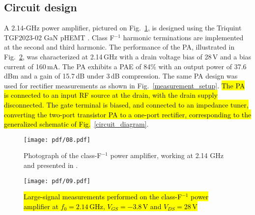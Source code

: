 \subsection {Circuit design}

A 2.14-GHz power amplifier, pictured on Fig.~\ref{amplifier}, is designed using the Triquint TGF2023-02 GaN pHEMT \cite{gan_pa_letter}. Class F$^{-1}$ harmonic terminations are implemented at the second and third harmonic. The performance of the PA, illustrated in  Fig.~\ref{PA_meas}, was characterized at 2.14\,GHz with a drain voltage bias of 28\,V and a bias current of 160\,mA. The PA exhibits a PAE of 84\% with an output power of 37.6\,dBm and a gain of 15.7\,dB under 3\,dB compression. The same PA design was used for rectifier measurements as shown in Fig.~\ref{measurement_setup}. \hl{The PA is connected to an input RF source at the drain, with the drain supply disconnected. The gate terminal is biased, and connected to an impedance tuner, converting the two-port transistor PA to a one-port rectifier, corresponding to the generalized schematic of Fig.}~\ref{circuit_diagram}.

\begin{figure}[ht!]
\centering
\texttt{[image: pdf/08.pdf]}
\caption{Photograph of the class-F$^{-1}$ power amplifier, working at 2.14 GHz and presented in \cite{gan_pa_letter}.}
\label{amplifier}
\end{figure}


\begin{figure}
  \begin{center}
  \texttt{[image: pdf/09.pdf]}
  \caption{\hl{Large-signal measurements performed on the class-F$^{-1}$ power amplifier at $f_0=2.14$\,GHz, $V_{GS}=-3.8$\,V and $V_{DS}=28$\,V}}
\label{PA_meas}
  \end{center}
\end{figure}









